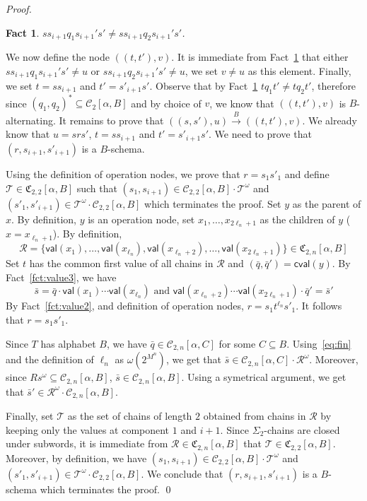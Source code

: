 \documentclass[envcountsame]{llncs}
\newcommand\Cs{\ensuremath{\mathcal{C}}\xspace}
\newcommand\Cstwo{\ensuremath{\Cs_2}\xspace}
\newcommand\Cstwotwo{\ensuremath{\Cstwolen2}\xspace}
\newcommand\Cstwolen[1]{\ensuremath{\Cs_{2,#1}}\xspace}
\newcommand\fCtwotwo{\ensuremath{\fCtwolen2}\xspace}
\newcommand\fCtwolen[1]{\ensuremath{\fC_{2,#1}}\xspace}
\newcommand\Ts{\ensuremath{\mathcal{T}}\xspace}
\newcommand\Rs{\ensuremath{\mathcal{R}}\xspace}
\newcommand{\sic}[1]{\ensuremath{\Sigma_{#1}}\xspace}
\newcommand\val[1]{\ensuremath{\textsf{val}(#1)\xspace}}
\newcommand\cval[1]{\ensuremath{\textsf{cval}(#1)\xspace}}
\newcommand\chains{chains\xspace}
\newcommand\qchains[1]{\ensuremath{\sic{#1}}-chains\xspace}
\newcommand\dchains{\qchains{2}}
\newcommand\fC{\ensuremath{\mathfrak C}\xspace}
\newtheorem{fact}[theorem]{Fact}
\begin{document}
\begin{proof}
  \begin{fact} \label{fct:ccont}
    $ss_{i+1}q_1s_{i+1}'s' \neq ss_{i+1}q_2s_{i+1}'s'$.
  \end{fact}

  We now define the node $((t,t'),v)$. It is immediate from
  Fact~\ref{fct:ccont} that either $ss_{i+1}q_1s_{i+1}'s' \neq u$ or
  $ss_{i+1}q_2s_{i+1}'s' \neq u$, we set $v \neq u$ as this element.
  Finally, we set $t = ss_{i+1}$ and $t' = s'_{i+1}s'$. Observe that by
  Fact~\ref{fct:ccont} $tq_1t' \neq tq_2t'$, therefore since
  $(q_1,q_2)^{*} \subseteq \Cstwo[\alpha,B]$ and by choice of $v$, we 
  know that $((t,t'),v)$ is $B$-alternating. It remains to prove that
  $((s,s'),u) \xrightarrow{B} ((t,t'),v)$. We already know that $u =
  srs'$, $t = ss_{i+1}$ and $t' = s'_{i+1}s'$. We need to prove that
  $(r,s_{i+1},s'_{i+1})$ is a $B$-schema.

  \medskip

  Using the definition of operation nodes, we prove that $r=s_1s'_1$
  and define $\Ts \in \fCtwotwo[\alpha,B]$ such that $(s_1,s_{i+1}) \in 
  \Cstwotwo[\alpha,B] \cdot \Ts^{\omega}$ and $(s'_1,s'_{i+1}) \in
  \Ts^{\omega} \cdot \Cstwotwo[\alpha,B]$ which terminates the
  proof. Set $y$ as the parent of $x$. By definition, $y$ is an
  operation node, set $x_1,\dots,x_{2\ell_n + 1}$ as the children of $y$
  ($x = x_{\ell_n+1}$). By definition, 
  \[
  \Rs = \{\val{x_1},\dots, \val{x_{\ell_n}},\val{x_{\ell_n+ 2}},\dots,
  \val{x_{2\ell_n+1}}\} \in \fCtwolen{n}[\alpha,B]
  \]
  Set $t$ has the common first value of all \chains in $\Rs$ and
  $(\bar{q},\bar{q}') = \cval{y}$. By Fact~\ref{fct:value3}, we have   
  \begin{equation}
    \bar{s} = \bar{q} \cdot \val{x_1} \cdots \val{x_{\ell_n}} \text{ and }
    \val{x_{\ell_n+2}} \cdots \val{x_{2\ell_n+1}} \cdot \bar{q}' =
    \bar{s}'
    \label{eq:fin}
  \end{equation}
  By Fact~\ref{fct:value2}, and definition of operation nodes, $r = s_1
  t^{\ell_n} s'_1$. It follows that $r=s_1s'_1$.

  Since $T$ has alphabet $B$, we have $\bar{q} \in \Cs_{2,n}[\alpha,C]$
  for some $C \subseteq B$. Using~\eqref{eq:fin} and the definition of
  $\ell_n$ as $\omega(2^{M^n})$, we get that $\bar{s} \in
  \Cs_{2,n}[\alpha,C] \cdot \Rs^\omega$. Moreover, since $Rs^{\omega}
  \subseteq \Cs_{2,n}[\alpha,B]$, $\bar{s} \in \Cs_{2,n}[\alpha,B]$.
  Using a symetrical argument, we get that $\bar{s}' \in \Rs^\omega
  \cdot \Cs_{2,n}[\alpha,B]$.

  Finally, set \Ts as the set of \chains of length $2$ obtained from
  \chains in \Rs by keeping only the values at component $1$ and
  $i+1$. Since \dchains are closed under subwords, it is immediate from
  $\Rs \in \fCtwolen{n}[\alpha,B]$ that $\Ts \in \fCtwotwo[\alpha,B]$.
  Moreover, by definition, we have $(s_1,s_{i+1}) \in
  \Cstwotwo[\alpha,B] \cdot \Ts^{\omega}$ and $(s'_1,s'_{i+1}) \in 
  \Ts^{\omega} \cdot \Cstwotwo[\alpha,B]$. We conclude that
  $(r,s_{i+1},s'_{i+1})$ is a $B$-schema  which terminates the proof. \qed
\end{proof}
\end{document}
